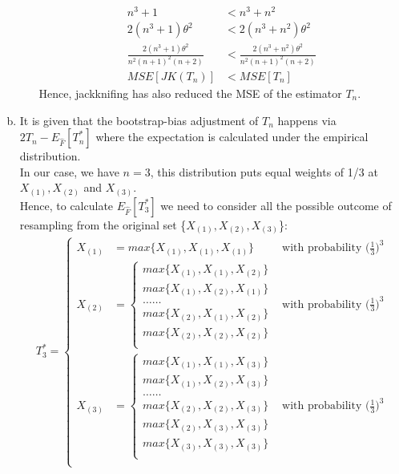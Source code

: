 \documentclass[a4paper,11pt]{article}
\begin{document}
\begin{enumerate}[a)]
\begin{enumerate}[i)]
\begin{align*}
		n^3+1 &< n^3 + n^2\\
		2(n^3+1)\theta^2 &<2(n^3 + n^2)\theta^2\\
		\frac{2(n^3+1)\theta^2}{n^2(n+1)^2(n+2)} &<\frac{2(n^3 + n^2)\theta^2}{n^2(n+1)^2(n+2)}\\
		MSE[JK(T_n)] &< MSE[T_n] 
	\end{align*}	
	Hence, jackknifing has also reduced the MSE of the estimator $T_n$.
	\end{enumerate}
\item
It is given that the bootstrap-bias adjustment of $T_n$ happens via $2T_n-E_{\hat{F}}[T^*_n] $ where the expectation is calculated under the empirical distribution.\\
In our case, we have $n=3$, this distribution puts equal weights of 1/3 at $X_{(1)}, X_{(2)}$ and $X_{(3)}$.\\
Hence, to calculate $E_{\hat{F}}[T^*_3] $ we need to consider all the possible outcome of resampling from the original set \{$X_{(1)}, X_{(2)},X_{(3)}$\}:
\begin{align*}
	T^*_3 =\left\{ 
			\begin{array}{rcl}   
				X_{(1)}&= max\{X_{(1)}, X_{(1)},X_{(1)}\}& \mbox{with probability } \bigg(\frac{1}{3}\bigg)^3 \\ 
				X_{(2)}&= \left\{ \begin{array}{rcl}   
							 max\{X_{(1)}, X_{(1)},X_{(2)}\} \\
							max\{X_{(1)}, X_{(2)},X_{(1)}\}\\
							\hdots \hdots  \\
							max\{X_{(2)}, X_{(1)},X_{(2)}\}\\
							max\{X_{(2)}, X_{(2)},X_{(2)}\}\\
						\end{array}\right.
							& \mbox{with probability } \bigg(\frac{1}{3}\bigg)^3 \\
				X_{(3)}&= \left\{ \begin{array}{rcl}   
							 max\{X_{(1)}, X_{(1)},X_{(3)}\} \\
							max\{X_{(1)}, X_{(2)},X_{(3)}\}\\
							\hdots \hdots \\
							max\{X_{(2)}, X_{(2)},X_{(3)}\}\\
							max\{X_{(2)}, X_{(3)},X_{(3)}\}\\
							max\{X_{(3)}, X_{(3)},X_{(3)}\}\\
						\end{array}\right.
							& \mbox{with probability } \bigg(\frac{1}{3}\bigg)^3 \\			

\end{array}
\end{align*}
\end{enumerate}
\end{document}
